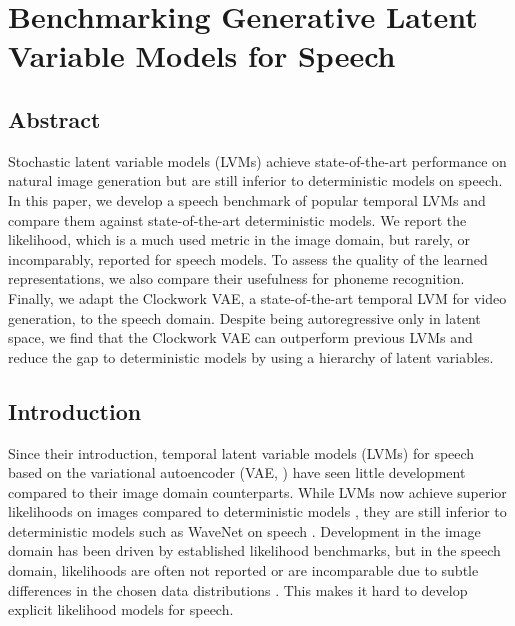 
\chapter[benchmarking generative latent variable models for speech]{Benchmarking Generative Latent Variable Models for Speech}
\label{chp:benchmarking}

\section{Abstract}
Stochastic latent variable models (LVMs) achieve state-of-the-art performance on natural image generation but are still inferior to deterministic models on speech. In this paper, we develop a speech benchmark of popular temporal LVMs and compare them against state-of-the-art deterministic models. We report the likelihood, which is a much used metric in the image domain, but rarely, or incomparably, reported for speech models. To assess the quality of the learned representations, we also compare their usefulness for phoneme recognition. Finally, we adapt the Clockwork VAE, a state-of-the-art temporal LVM for video generation, to the speech domain. Despite being autoregressive only in latent space, we find that the Clockwork VAE can outperform previous LVMs and reduce the gap to deterministic models by using a hierarchy of latent variables.




\section{Introduction}
Since their introduction, temporal latent variable models (LVMs) for speech \cite{chung_recurrent_2015, fraccaro_sequential_2016} based on the variational autoencoder (VAE,  \textcite{kingma_autoencoding_2014, rezende_stochastic_2014}) have seen little development compared to their image domain counterparts. While LVMs now achieve superior likelihoods on images compared to deterministic models \cite{child_very_2021,sinha_consistency_2021,kingma_variational_2021}, they are still inferior to deterministic models such as WaveNet on speech \cite{oord_wavenet_2016}.
Development in the image domain has been driven by established likelihood benchmarks, but in the speech domain, likelihoods are often not reported \cite{oord_wavenet_2016, hsu_unsupervised_2017, oord_neural_2018} or are incomparable due to subtle differences in the chosen data distributions \cite{chung_recurrent_2015, fraccaro_sequential_2016, hsu_unsupervised_2017, aksan_stcn_2019}. 
This makes it hard to develop explicit likelihood models for speech.

